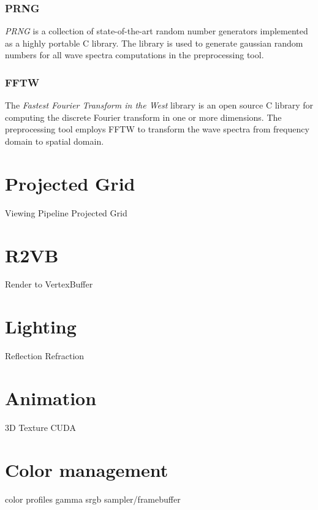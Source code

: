 \subsubsection{PRNG}

\textit{PRNG}\cite{misc:prng} is a collection of state-of-the-art random number
generators implemented as a highly portable C library. The library is used to
generate gaussian random numbers for all wave spectra computations in the
preprocessing tool.

\subsubsection{FFTW}
The \textit{Fastest Fourier Transform in the West} library\cite{misc:fftw} is an
open source C library for computing the discrete Fourier transform in one or
more dimensions. The preprocessing tool employs FFTW to transform the wave
spectra from frequency domain to spatial domain.

\section{Projected Grid}
Viewing Pipeline
Projected Grid

\section{R2VB}
Render to VertexBuffer

\section{Lighting}
Reflection
Refraction

\section{Animation}
3D Texture
CUDA

\section{Color management}
color profiles
gamma
srgb sampler/framebuffer